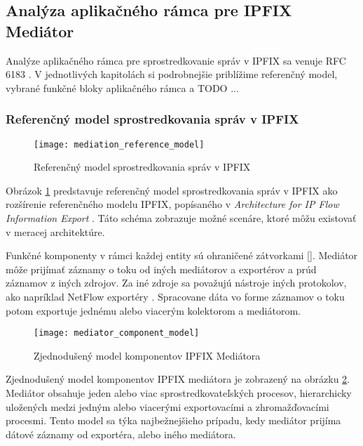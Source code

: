 \subsection{Analýza aplikačného rámca pre IPFIX Mediátor} \label{sec:framework}

Analýze aplikačného rámca pre sprostredkovanie správ v IPFIX sa venuje RFC 6183 \citep{rfc6183}. 
V jednotlivých kapitolách si podrobnejšie priblížime referenčný model, vybrané funkčné bloky 
aplikačného rámca a TODO ...

\subsubsection{Referenčný model sprostredkovania správ v IPFIX}

\begin{figure}[ht!]
\centering
\texttt{[image: mediation\_reference\_model]}
\caption{Referenčný model sprostredkovania správ v IPFIX}\label{o:mediation_reference_model}
\end{figure}

Obrázok \ref{o:mediation_reference_model} predstavuje referenčný model sprostredkovania správ v IPFIX 
ako rozšírenie referenčného modelu IPFIX, popísaného v \emph{Architecture for IP Flow Information Export} 
\citep{rfc5470}. Táto schéma zobrazuje možné scenáre, ktoré môžu existovať v meracej architektúre.

Funkčné komponenty v rámci každej entity sú ohraničené zátvorkami []. Mediátor môže prijímať 
záznamy o toku od iných mediátorov a exportérov a prúd záznamov z iných zdrojov.
Za iné zdroje sa považujú nástroje iných protokolov, ako napríklad NetFlow exportéry \citep{rfc3954}. 
Spracovane dáta vo forme záznamov o toku potom exportuje jednému alebo viacerým kolektorom a mediátorom.

\begin{figure}[ht!]
\centering
\texttt{[image: mediator\_component\_model]}
\caption{Zjednodušený model komponentov IPFIX Mediátora}\label{o:mediator_component_model}
\end{figure}

Zjednodušený model komponentov IPFIX mediátora je zobrazený na obrázku \ref{o:mediator_component_model}. 
Mediátor obsahuje jeden alebo viac sprostredkovateľských procesov, hierarchicky uložených 
medzi jedným alebo viacerými exportovacími a zhromažďovacími procesmi. Tento model sa týka 
najbežnejšieho prípadu, kedy mediátor prijíma dátové záznamy od exportéra, alebo iného mediátora.


